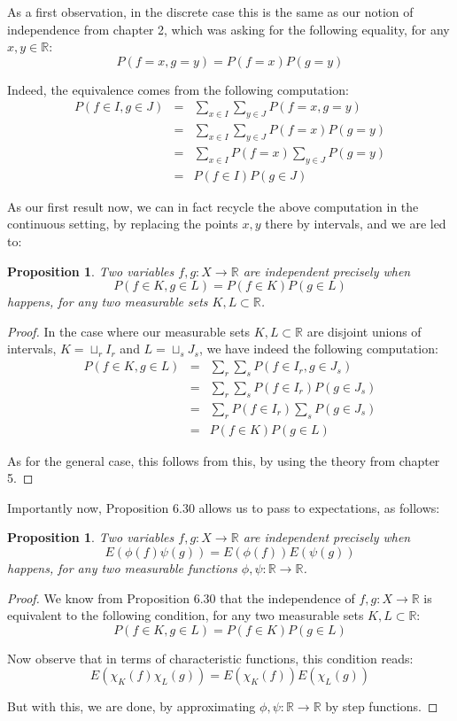 \documentclass[12pt]{amsbook}
\newtheorem{proposition}[theorem]{Proposition}
\begin{document}
As a first observation, in the discrete case this is the same as our notion of independence from chapter 2, which was asking for the following equality, for any $x,y\in\mathbb R$:
$$P(f=x,g=y)=P(f=x)P(g=y)$$

Indeed, the equivalence comes from the following computation:
\begin{eqnarray*}
P(f\in I,g\in J)
&=&\sum_{x\in I}\sum_{y\in J}P(f=x,g=y)\\
&=&\sum_{x\in I}\sum_{y\in J}P(f=x)P(g=y)\\
&=&\sum_{x\in I}P(f=x)\sum_{y\in J}P(g=y)\\
&=&P(f\in I)P(g\in J)
\end{eqnarray*}

As our first result now, we can in fact recycle the above computation in the continuous setting, by replacing the points $x,y$ there by intervals, and we are led to:

\begin{proposition}
Two variables $f,g:X\to\mathbb R$ are independent precisely when
$$P(f\in K,g\in L)=P(f\in K)P(g\in L)$$
happens, for any two measurable sets $K,L\subset\mathbb R$.
\end{proposition}

\begin{proof}
In the case where our measurable sets $K,L\subset\mathbb R$ are disjoint unions of intervals, $K=\sqcup_rI_r$ and $L=\sqcup_sJ_s$, we have indeed the following computation:
\begin{eqnarray*}
P(f\in K,g\in L)
&=&\sum_r\sum_sP(f\in I_r,g\in J_s)\\
&=&\sum_r\sum_sP(f\in I_r)P(g\in J_s)\\
&=&\sum_rP(f\in I_r)\sum_sP(g\in J_s)\\
&=&P(f\in K)P(g\in L)
\end{eqnarray*}

As for the general case, this follows from this, by using the theory from chapter 5.
\end{proof}

Importantly now, Proposition 6.30 allows us to pass to expectations, as follows:

\begin{proposition}
Two variables $f,g:X\to\mathbb R$ are independent precisely when
$$E(\phi(f)\psi(g))=E(\phi(f))E(\psi(g))$$
happens, for any two measurable functions $\phi,\psi:\mathbb R\to\mathbb R$.
\end{proposition}

\begin{proof}
We know from Proposition 6.30 that the independence of $f,g:X\to\mathbb R$ is equivalent to the following condition, for any two measurable sets $K,L\subset\mathbb R$:
$$P(f\in K,g\in L)=P(f\in K)P(g\in L)$$

Now observe that in terms of characteristic functions, this condition reads:
$$E(\chi_K(f)\chi_L(g))=E(\chi_K(f))E(\chi_L(g))$$

But with this, we are done, by approximating $\phi,\psi:\mathbb R\to\mathbb R$ by step functions.
\end{proof}
\end{document}

